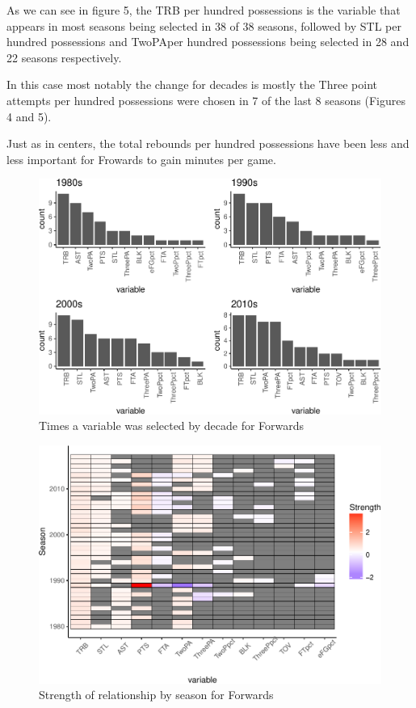 \documentclass[]{elsarticle} %
\makeatletter
\def\maxwidth{\ifdim\Gin@nat@width>\linewidth\linewidth
\else\Gin@nat@width\fi}
\let\Oldincludegraphics\includegraphics
\renewcommand{\includegraphics}[1]{\Oldincludegraphics[width=\maxwidth]{#1}}
\makeatother
\begin{document}
As we can see in figure 5, the TRB per hundred possessions is the
variable that appears in most seasons being selected in 38 of 38
seasons, followed by STL per hundred possessions and TwoPAper hundred
possessions being selected in 28 and 22 seasons respectively.

In this case most notably the change for decades is mostly the Three
point attempts per hundred possessions were chosen in 7 of the last 8
seasons (Figures 4 and 5).

Just as in centers, the total rebounds per hundred possessions have been
less and less important for Frowards to gain minutes per game.

\begin{figure}[htbp]
\centering
\includegraphics{Coaching_Selection_files/figure-latex/unnamed-chunk-10-1.pdf}
\caption{Times a variable was selected by decade for Forwards}
\end{figure}

\begin{figure}[htbp]
\centering
\includegraphics{Coaching_Selection_files/figure-latex/unnamed-chunk-11-1.pdf}
\caption{Strength of relationship by season for Forwards}
\end{figure}
\end{document}
